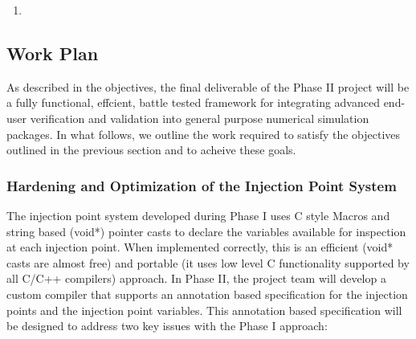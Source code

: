 \begin{enumerate}
\item {} 

\end{enumerate}

\subsection{Work Plan}
\label{sec:workplan}

As described in the objectives, the final deliverable of the Phase II project will be a fully functional, effcient, battle tested framework 
for integrating advanced end-user verification and validation into general purpose numerical simulation packages. In what follows, we outline
the work required to satisfy the objectives outlined in the previous section and to acheive these goals. 

\subsubsection{Hardening and Optimization of the Injection Point System}

The injection point system developed during Phase I uses C style Macros and string based (void*) pointer casts to declare the variables available for inspection
at each injection point.  When implemented correctly, this is an efficient (void* casts are almost free) and portable (it uses low level C functionality supported by all C/C++ compilers) approach. In Phase II, the project team will develop a custom compiler that supports an annotation based specification for the injection points and the injection point variables. This annotation based specification will be designed to address two key issues with the Phase I approach:

